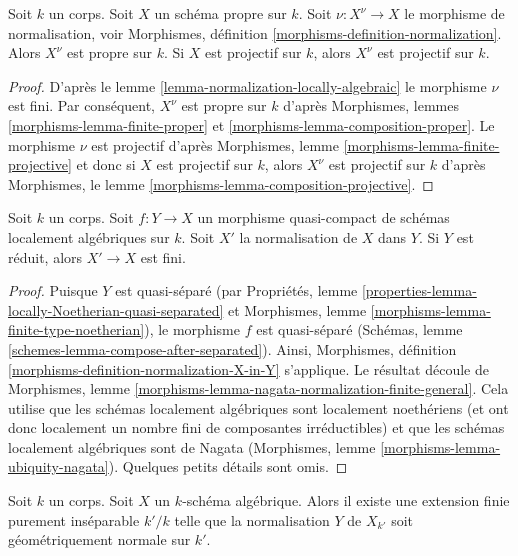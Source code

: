 \begin{lemma}
\label{lemma-normalize-projective}
 Soit $k$ un corps. Soit $X$ un schéma propre sur $k$.
Soit $\nu : X^\nu \to X$ le morphisme de normalisation,
voir Morphismes, définition \ref{morphisms-definition-normalization}.
Alors $X^\nu$ est propre sur $k$. Si $X$ est projectif sur $k$,
alors $X^\nu$ est projectif sur $k$. 
\end{lemma}

\begin{proof}
 D'après le lemme \ref{lemma-normalization-locally-algebraic} le morphisme $\nu$
 est fini. Par conséquent, $X^\nu$ est propre sur $k$
 d'après Morphismes, lemmes \ref{morphisms-lemma-finite-proper} et 
\ref{morphisms-lemma-composition-proper}.
Le morphisme $\nu$ est projectif d'après
Morphismes, lemme \ref{morphisms-lemma-finite-projective}
 et donc si $X$ est projectif sur $k$, alors $X^\nu$ est projectif sur $k$
 d'après Morphismes, le lemme \ref{morphisms-lemma-composition-projective}. 
\end{proof}

\begin{lemma}
\label{lemma-relative-normalization-finite}
 Soit $k$ un corps. Soit $f : Y \to X$ un morphisme
quasi-compact de schémas localement algébriques sur $k$. Soit $X'$
 la normalisation de $X$ dans $Y$. Si $Y$ est réduit, alors 
$X' \to X$ est fini. 
\end{lemma}

\begin{proof}
 Puisque $Y$ est quasi-séparé (par
Propriétés, lemme \ref{properties-lemma-locally-Noetherian-quasi-separated}
 et Morphismes, lemme \ref{morphisms-lemma-finite-type-noetherian}),
le morphisme $f$ est quasi-séparé
(Schémas, lemme \ref{schemes-lemma-compose-after-separated}).
Ainsi, Morphismes, définition \ref{morphisms-definition-normalization-X-in-Y}
 s'applique. Le résultat découle de Morphismes, lemme 
\ref{morphisms-lemma-nagata-normalization-finite-general}.
Cela utilise que les schémas localement algébriques sont localement noethériens
(et ont donc localement un nombre fini de composantes irréductibles)
et que les schémas localement algébriques sont de
Nagata (Morphismes, lemme \ref{morphisms-lemma-ubiquity-nagata}).
Quelques petits détails sont omis. 
\end{proof}

\begin{lemma}
\label{lemma-finite-extension-geometrically-normal}
 Soit $k$ un corps. Soit $X$ un $k$-schéma
algébrique. Alors il existe une extension finie purement inséparable $k'/k$
 telle que la normalisation $Y$ de $X_{k'}$ soit géométriquement normale sur $k'$. 
\end{lemma}

